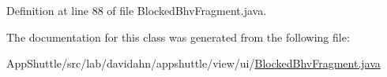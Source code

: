 \-Definition at line 88 of file \-Blocked\-Bhv\-Fragment.\-java.



\-The documentation for this class was generated from the following file\-:\begin{DoxyCompactItemize}
\item 
\-App\-Shuttle/src/lab/davidahn/appshuttle/view/ui/\hyperlink{_blocked_bhv_fragment_8java}{\-Blocked\-Bhv\-Fragment.\-java}\end{DoxyCompactItemize}
